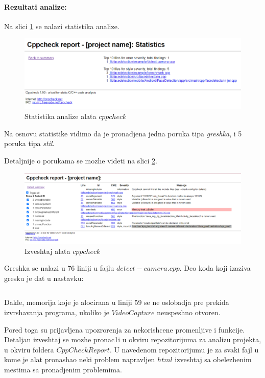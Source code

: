 \documentclass{article}
\begin{document}
\paragraph{Rezultati analize:}
Na slici \ref{stats:cppcheck} se nalazi statistika analize.

\begin{figure}[H]
    \centering
    \includegraphics[width=12cm]{img/cppCheck/cppCheckStats.png}
    \caption{Statistika analize alata $cppcheck$}
    \label{stats:cppcheck}
\end{figure}
Na osnovu statistike vidimo da je pronadjena jedna poruka tipa \textit{greshka}, i 5 poruka tipa \textit{stil}.

Detaljnije o porukama se mozhe videti na slici \ref{html:cppcheck}.
\begin{figure}[H]
    \centering
    \includegraphics[width=12cm]{img/cppCheck/cppChechHtmlReport.png}
    \caption{Izveshtaj alata $cppcheck$}
    \label{html:cppcheck}
\end{figure}

Greshka se nalazi u 76 liniji u fajlu $detect-camera.cpp$. Deo koda koji izaziva gresku je dat u nastavku:
\selectfont

\inputminted[frame=lines,
framesep=2mm,
baselinestretch=1.2,
bgcolor=LightGray,
fontsize=\footnotesize,
firstline=55,
lastline=77,
linenos
]{cpp}{detect-camera.cpp}

\selectfont
Dakle, memorija koje je alocirana u liniji 59 se ne oslobadja pre prekida izvrshavanja programa, ukoliko je $VideoCapture$ neuspeshno otvoren.

Pored toga su prijavljena upozrorenja za nekorishcene promenljive i funkcije. Detaljan izveshtaj se mozhe pronac1i u okviru repozitorijuma za analizu projekta, u okviru foldera $CppCheckReport.$ U navedenom repozitorijumu je za svaki fajl u kome je alat pronashao neki problem napravljen $html$ izveshtaj sa obelezhenim mestima sa pronadjenim problemima.
\end{document}
